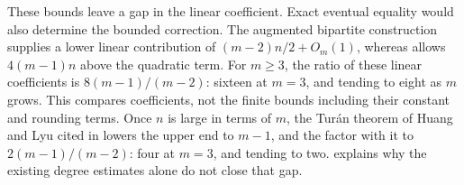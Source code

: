 These bounds leave a gap in the linear coefficient. Exact eventual equality would also determine the bounded correction. The augmented bipartite construction supplies a lower linear contribution of $(m-2)n/2+O_m(1)$, whereas  allows $4(m-1)n$ above the quadratic term. For $m\ge3$, the ratio of these linear coefficients is $8(m-1)/(m-2)$: sixteen at $m = 3$, and tending to eight as $m$ grows. This compares coefficients, not the finite bounds including their constant and rounding terms. Once $n$ is large in terms of $m$, the Tur\'an theorem of Huang and Lyu \cite{HuangLyu26} cited in  lowers the upper end to $m-1$, and the factor with it to $2(m-1)/(m-2)$: four at $m = 3$, and tending to two.  explains why the existing degree estimates alone do not close that gap.

